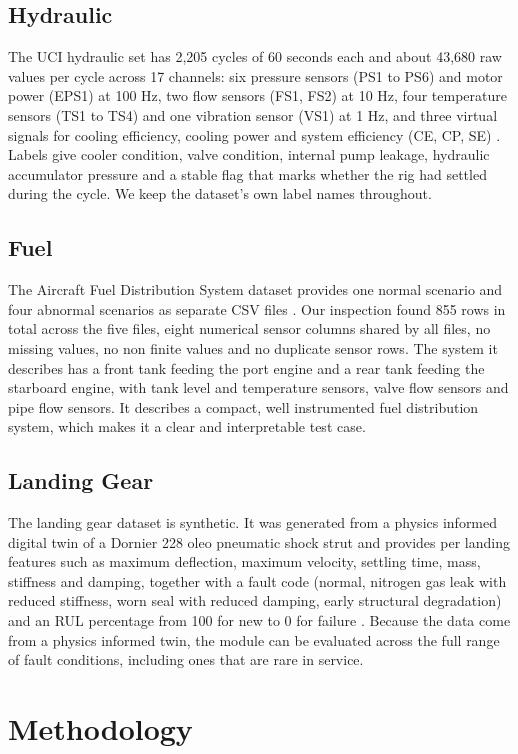 \documentclass[conference]{IEEEtran}
\begin{document}
\subsection{Hydraulic}
The UCI hydraulic set has 2,205 cycles of 60 seconds each and about 43,680 raw values per cycle across 17 channels: six pressure sensors (PS1 to PS6) and motor power (EPS1) at 100 Hz, two flow sensors (FS1, FS2) at 10 Hz, four temperature sensors (TS1 to TS4) and one vibration sensor (VS1) at 1 Hz, and three virtual signals for cooling efficiency, cooling power and system efficiency (CE, CP, SE) \cite{b25}. Labels give cooler condition, valve condition, internal pump leakage, hydraulic accumulator pressure and a stable flag that marks whether the rig had settled during the cycle. We keep the dataset's own label names throughout.

\subsection{Fuel}
The Aircraft Fuel Distribution System dataset provides one normal scenario and four abnormal scenarios as separate CSV files \cite{b33}. Our inspection found 855 rows in total across the five files, eight numerical sensor columns shared by all files, no missing values, no non finite values and no duplicate sensor rows. The system it describes has a front tank feeding the port engine and a rear tank feeding the starboard engine, with tank level and temperature sensors, valve flow sensors and pipe flow sensors. It describes a compact, well instrumented fuel distribution system, which makes it a clear and interpretable test case.

\subsection{Landing Gear}
The landing gear dataset is synthetic. It was generated from a physics informed digital twin of a Dornier 228 oleo pneumatic shock strut and provides per landing features such as maximum deflection, maximum velocity, settling time, mass, stiffness and damping, together with a fault code (normal, nitrogen gas leak with reduced stiffness, worn seal with reduced damping, early structural degradation) and an RUL percentage from 100 for new to 0 for failure \cite{b39, b40}. Because the data come from a physics informed twin, the module can be evaluated across the full range of fault conditions, including ones that are rare in service.

\section{Methodology}
\end{document}
